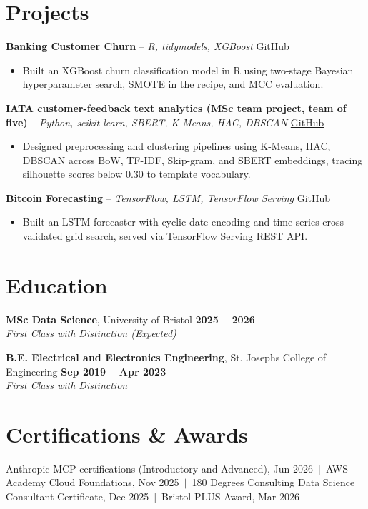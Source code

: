 \documentclass[a4paper,11pt]{article}
\begin{document}
\section{Projects}
\noindent\textbf{Banking Customer Churn} -- \textit{R, tidymodels, XGBoost} \hfill \href{https://github.com/Thiruvel-AP/Banking-Customer-Churn-Prediction}{GitHub}
\begin{itemize}
  \item Built an XGBoost churn classification model in R using two-stage Bayesian hyperparameter search, SMOTE in the recipe, and MCC evaluation.
\end{itemize}
\vspace{3pt}
\noindent\textbf{IATA customer-feedback text analytics (MSc team project, team of five)} -- \textit{Python, scikit-learn, SBERT, K-Means, HAC, DBSCAN} \hfill \href{https://github.com/Thiruvel-AP/TextAnalytics}{GitHub}
\begin{itemize}
  \item Designed preprocessing and clustering pipelines using K-Means, HAC, DBSCAN across BoW, TF-IDF, Skip-gram, and SBERT embeddings, tracing silhouette scores below 0.30 to template vocabulary.
\end{itemize}
\vspace{3pt}
\noindent\textbf{Bitcoin Forecasting} -- \textit{TensorFlow, LSTM, TensorFlow Serving} \hfill \href{https://github.com/Thiruvel-AP/BitcoinForecasting}{GitHub}
\begin{itemize}
  \item Built an LSTM forecaster with cyclic date encoding and time-series cross-validated grid search, served via TensorFlow Serving REST API.
\end{itemize}

\section{Education}
\textbf{MSc Data Science}, University of Bristol \hfill \textbf{2025 – 2026}\\ \textit{First Class with Distinction (Expected)}\par
\vspace{3pt}
\textbf{B.E. Electrical and Electronics Engineering}, St. Joseph\textquotesingle{}s College of Engineering \hfill \textbf{Sep 2019 – Apr 2023}\\ \textit{First Class with Distinction}\par

\section{Certifications \& Awards}
Anthropic MCP certifications (Introductory and Advanced), Jun 2026 \,$|$\, AWS Academy Cloud Foundations, Nov 2025 \,$|$\, 180 Degrees Consulting Data Science Consultant Certificate, Dec 2025 \,$|$\, Bristol PLUS Award, Mar 2026
\end{document}
